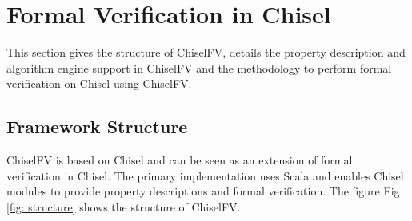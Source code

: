 \documentclass[conference]{IEEEtran}
\theoremstyle{definition}
\begin{document}


\section{Formal Verification in Chisel}

This section gives the structure of ChiselFV, details the property description and algorithm engine support in ChiselFV and the methodology to perform formal verification on Chisel using ChiselFV.

\subsection{Framework Structure}

ChiselFV is based on Chisel and can be seen as an extension of formal verification in Chisel. The primary implementation uses Scala and enables Chisel modules to provide property descriptions and formal verification. The figure Fig \ref{fig: structure} shows the structure of ChiselFV.
\end{document}
